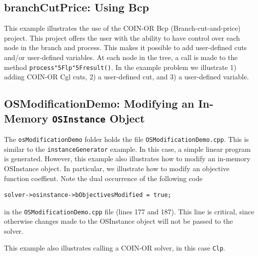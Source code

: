 \documentclass[11pt]{article}
\renewcommand{\_}{{\char"5F}}
\renewcommand{\{}{{\char"7B}}
\renewcommand{\}}{{\char"7D}}
\renewcommand{\^}{{\char"0D}}
\renewcommand{\'}{{\char"0D}}
\begin{document}
\begin{enumerate}[Step 1:]


\subsection{branchCutPrice:  Using Bcp}\label{section:examplebranchCutPrice}

This example illustrates the use of the COIN-OR Bcp (Branch-cut-and-price) project.  This project offers the user with the ability to have control over each node in the branch and process. This makes it possible to add user-defined cuts and/or user-defined variables. At each node in the tree, a call is made to the method {\tt process\_lp\_result()}. In the example problem we illustrate 1) adding COIN-OR Cgl cuts, 2) a user-defined cut, and 3) a user-defined variable. 


\subsection{OSModificationDemo: Modifying an In-Memory {\tt OSInstance} Object}\label{section:exampleOSModDemo}

The {\tt osModificationDemo} folder holds the file {\tt OSModificationDemo.cpp}.
This is similar to the {\tt instanceGenerator} example. In this case, a simple
linear program is generated. However, this example also illustrates how to
modify an in-memory OSInstance object. In particular, we illustrate how to
modify an objective function coeffient. Note the dual occurrence of the
following code

\begin{verbatim}
solver->osinstance->bObjectivesModified = true;
\end{verbatim}

in the {\tt OSModificationDemo.cpp} file (lines 177 and 187).
This line is critical, since otherwise changes made to the OSInstance object
will not be passed to the solver.

This example also illustrates calling a COIN-OR solver,
in this case {\tt Clp}.


\end{enumerate}
\end{document}
